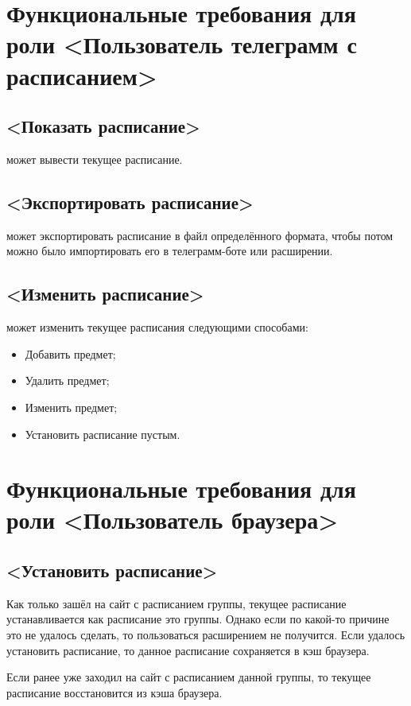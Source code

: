 	\section{Функциональные требования для роли <Пользователь телеграмм с расписанием>}
		\subsection{<Показать расписание>}
			 может вывести текущее расписание.
		\subsection{<Экспортировать расписание>}
			 может экспортировать расписание в файл определённого формата, чтобы потом можно было импортировать его в телеграмм-боте или расширении.
		\subsection{<Изменить расписание>}
			 может изменить текущее расписания следующими способами:
			\begin{itemize}
				\item Добавить предмет;
				
				\item Удалить предмет;
				
				\item Изменить предмет;
				
				\item Установить расписание пустым.
			\end{itemize}
	\section{Функциональные требования для роли <Пользователь браузера>}
		\subsection{<Установить расписание>}
			Как только  зашёл на сайт с расписанием группы, текущее расписание устанавливается как расписание это группы. Однако если по какой-то причине это не удалось сделать, то пользоваться расширением не получится.  Если удалось установить расписание, то данное расписание сохраняется в кэш браузера.
			
			Если  ранее уже заходил на сайт с расписанием данной группы, то текущее расписание восстановится из кэша браузера.
